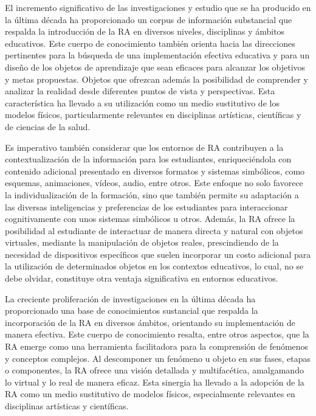 \documentclass[spanish]{textolivre}
\begin{document}
El incremento significativo de las investigaciones y estudio que se ha producido en la última década ha proporcionado un corpus de información substancial que respalda la introducción de la RA en diversos niveles, disciplinas y ámbitos educativos. Este cuerpo de conocimiento también orienta hacia las direcciones pertinentes para la búsqueda de una implementación efectiva educativa y para un diseño de los objetos de aprendizaje que sean eficaces para alcanzar los objetivos y metas propuestas. Objetos que ofrezcan además la posibilidad de comprender y analizar la realidad desde diferentes puntos de vista y perspectivas. Esta característica ha llevado a su utilización como un medio sustitutivo de los modelos físicos, particularmente relevantes en disciplinas artísticas, científicas y de ciencias de la salud.

Es imperativo también considerar que los entornos de RA contribuyen a la contextualización de la información para los estudiantes, enriqueciéndola con contenido adicional presentado en diversos formatos y sistemas simbólicos, como esquemas, animaciones, vídeos, audio, entre otros. Este enfoque no solo favorece la individualización de la formación, sino que también permite su adaptación a las diversas inteligencias y preferencias de los estudiantes para interaccionar cognitivamente con unos sistemas simbólicos u otros. Además, la RA ofrece la posibilidad al estudiante de interactuar de manera directa y natural con objetos virtuales, mediante la manipulación de objetos reales, prescindiendo de la necesidad de dispositivos específicos que suelen incorporar un costo adicional para la utilización de determinados objetos en los contextos educativos, lo cual, no se debe olvidar, constituye otra ventaja significativa en entornos educativos.

La creciente proliferación de investigaciones en la última década ha proporcionado una base de conocimientos sustancial que respalda la incorporación de la RA en diversos ámbitos, orientando su implementación de manera efectiva. Este cuerpo de conocimiento resalta, entre otros aspectos, que la RA emerge como una herramienta facilitadora para la comprensión de fenómenos y conceptos complejos. Al descomponer un fenómeno u objeto en sus fases, etapas o componentes, la RA ofrece una visión detallada y multifacética, amalgamando lo virtual y lo real de manera eficaz. Esta sinergia ha llevado a la adopción de la RA como un medio sustitutivo de modelos físicos, especialmente relevantes en disciplinas artísticas y científicas.
\end{document}
